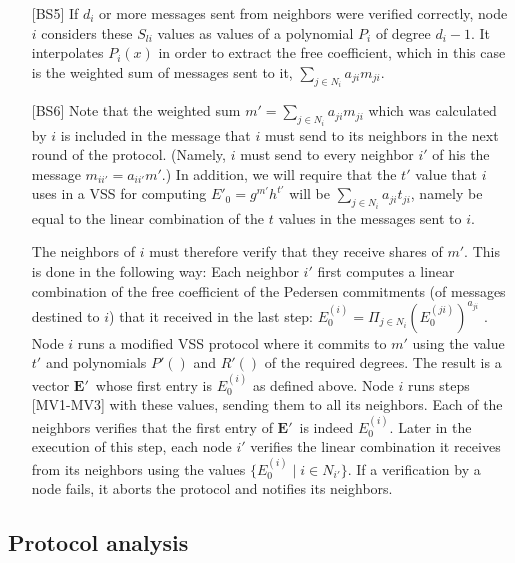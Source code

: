 \documentclass[10pt]{svjour3}
\begin{document}
\begin{itemize}
\item [{[BS5]}] If $d_i$ or more messages sent from neighbors were verified
      correctly, node $i$ considers these $S_{li}$ values as values of a
      polynomial $P_i$ of degree $d_i-1$. It interpolates $P_i(x)$ in
      order to extract the free coefficient, which in this case is the
      weighted sum of messages sent to it, $\sum_{j \in N_i} a_{ji}
      m_{ji}$.

    \item [{[BS6]}] Note that the weighted sum $m'=\sum_{j \in N_i}
      a_{ji} m_{ji}$ which was calculated by $i$ is included in the message
      that $i$ must send to its neighbors in the next round of the
      protocol. (Namely, $i$ must send to every neighbor $i'$ of his
      the message $m_{ii'}=a_{ii'} m'$.) In addition, we will require that the
      $t'$ value that $i$ uses in a VSS for computing $E'_0=g^{m'}h^{t'}$
      will be $\sum_{j \in N_i} a_{ji} t_{ji}$, namely be equal to the
      linear combination of the $t$ values in the messages sent to $i$.

      The neighbors of $i$ must therefore verify that they receive
      shares of $m'$.  This is done in the following way: Each
      neighbor $i'$ first computes a linear combination of the free
      coefficient of the Pedersen commitments (of messages destined to
      $i$) that it received in the last
      step: $E_0^{(i)} = \Pi_{j \in N_i}
      (E_0^{(ji)})^{a_{ji}}\,\,$. Node $i$ runs a modified VSS
      protocol where it commits to $m'$ using the value $t'$ and
      polynomials $P'()$ and $R'()$ of the required degrees. The result is a
      vector $\mathbf{E'}$\ whose first entry is $E^{(i)}_0$ as defined
      above.  Node $i$ runs steps [MV1-MV3] with these values,
      sending them to all its neighbors. Each of the neighbors
      verifies that the first entry of $\mathbf{E'}$\  is indeed
      $E^{(i)}_0$.
Later in the execution of  this step,
      each node $i'$ verifies the linear combination it receives from its
      neighbors  using  the values  $\{ E^{(i)}_0 \; | \; i\in N_{i'} \}$.
If a verification by a node fails, it
      aborts the protocol and notifies its neighbors.



\end{itemize}







\subsection{Protocol analysis}
\label{prot_analysis}
\end{document}
